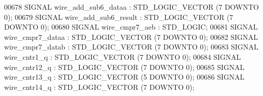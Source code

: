 \begin{DoxyCode}
{00678      \textcolor{keywordflow}{SIGNAL}  \textcolor{vhdlchar}{wire_add_sub6_dataa}    \textcolor{vhdlchar}{:}   \textcolor{comment}{STD\_LOGIC\_VECTOR} \textcolor{vhdlchar}{(}\textcolor{vhdllogic}{}\textcolor{vhdllogic}{7} \textcolor{keywordflow}{DOWNTO} \textcolor{vhdllogic}{}\textcolor{vhdllogic}{0}\textcolor{vhdlchar}{)};
00679      \textcolor{keywordflow}{SIGNAL}  \textcolor{vhdlchar}{wire_add_sub6_result}   \textcolor{vhdlchar}{:}   \textcolor{comment}{STD\_LOGIC\_VECTOR} \textcolor{vhdlchar}{(}\textcolor{vhdllogic}{}\textcolor{vhdllogic}{7} \textcolor{keywordflow}{DOWNTO} \textcolor{vhdllogic}{}\textcolor{vhdllogic}{0}\textcolor{vhdlchar}{)};
00680      \textcolor{keywordflow}{SIGNAL}  \textcolor{vhdlchar}{wire_cmpr7_aeb} \textcolor{vhdlchar}{:}   \textcolor{comment}{STD\_LOGIC};
00681      \textcolor{keywordflow}{SIGNAL}  \textcolor{vhdlchar}{wire_cmpr7_dataa}   \textcolor{vhdlchar}{:}   \textcolor{comment}{STD\_LOGIC\_VECTOR} \textcolor{vhdlchar}{(}\textcolor{vhdllogic}{}\textcolor{vhdllogic}{7} \textcolor{keywordflow}{DOWNTO} \textcolor{vhdllogic}{}\textcolor{vhdllogic}{0}\textcolor{vhdlchar}{)};
00682      \textcolor{keywordflow}{SIGNAL}  \textcolor{vhdlchar}{wire_cmpr7_datab}   \textcolor{vhdlchar}{:}   \textcolor{comment}{STD\_LOGIC\_VECTOR} \textcolor{vhdlchar}{(}\textcolor{vhdllogic}{}\textcolor{vhdllogic}{7} \textcolor{keywordflow}{DOWNTO} \textcolor{vhdllogic}{}\textcolor{vhdllogic}{0}\textcolor{vhdlchar}{)};
00683      \textcolor{keywordflow}{SIGNAL}  \textcolor{vhdlchar}{wire_cntr1_q}   \textcolor{vhdlchar}{:}   \textcolor{comment}{STD\_LOGIC\_VECTOR} \textcolor{vhdlchar}{(}\textcolor{vhdllogic}{}\textcolor{vhdllogic}{7} \textcolor{keywordflow}{DOWNTO} \textcolor{vhdllogic}{}\textcolor{vhdllogic}{0}\textcolor{vhdlchar}{)};
00684      \textcolor{keywordflow}{SIGNAL}  \textcolor{vhdlchar}{wire_cntr12_q}  \textcolor{vhdlchar}{:}   \textcolor{comment}{STD\_LOGIC\_VECTOR} \textcolor{vhdlchar}{(}\textcolor{vhdllogic}{}\textcolor{vhdllogic}{7} \textcolor{keywordflow}{DOWNTO} \textcolor{vhdllogic}{}\textcolor{vhdllogic}{0}\textcolor{vhdlchar}{)};
00685      \textcolor{keywordflow}{SIGNAL}  \textcolor{vhdlchar}{wire_cntr13_q}  \textcolor{vhdlchar}{:}   \textcolor{comment}{STD\_LOGIC\_VECTOR} \textcolor{vhdlchar}{(}\textcolor{vhdllogic}{}\textcolor{vhdllogic}{5} \textcolor{keywordflow}{DOWNTO} \textcolor{vhdllogic}{}\textcolor{vhdllogic}{0}\textcolor{vhdlchar}{)};
00686      \textcolor{keywordflow}{SIGNAL}  \textcolor{vhdlchar}{wire_cntr14_q}  \textcolor{vhdlchar}{:}   \textcolor{comment}{STD\_LOGIC\_VECTOR} \textcolor{vhdlchar}{(}\textcolor{vhdllogic}{}\textcolor{vhdllogic}{7} \textcolor{keywordflow}{DOWNTO} \textcolor{vhdllogic}{}\textcolor{vhdllogic}{0}\textcolor{vhdlchar}{)};
}
\end{DoxyCode}
